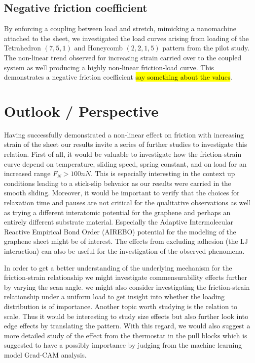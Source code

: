 \subsection{Negative friction coefficient}
By enforcing a coupling between load and stretch, mimicking a nanomachine attached to the sheet, we investigated the load curves arising from loading of the Tetrahedron $(7,5,1)$ and Honeycomb $(2,2,1,5)$ pattern from the pilot study. The non-linear trend observed for increasing strain carried over to the coupled system as well producing a highly non-linear friction-load curve. This demonstrates a negative friction coefficient \hl{say something about the values}.



\section{Outlook / Perspective}

Having successfully demonstrated a non-linear effect on friction with increasing
strain of the sheet our results invite a series of further studies to investigate this relation. First of all, it would be valuable to investigate how the friction-strain curve depend on temperature, sliding speed, spring constant, and on load for an increased range $F_N > 100 nN$. This is especially interesting in the context up conditions leading to a stick-slip behvaior as our results were carried in the smooth sliding. Moreover, it would be important to verify that the choices for relaxation time and pauses are not critical for the qualitative observations as well as trying a different
interatomic potential for the graphene and perhaps an entirely different
substrate material. Especially the Adaptive Intermolecular Reactive Empirical
Bond Order (AIREBO) potential for the modeling of the graphene sheet might be of interest. The effects from excluding adhesion (the \acrshort{LJ} interaction) can also be useful for the investigation of the observed phenomena. 


In order to get a better understanding of the underlying mechanism for the friction-strain relationship we might investigate commensurability effects further by varying the scan angle. we might also consider investigating the friction-strain relationship under a uniform load to get insight into whether the loading distribution is of importance. Another topic worth studying is the relation to scale. Thus it would be interesting to study size effects but also further look into edge effects by translating the pattern. With this regard, we would also suggest a more detailed study of the effect from the thermostat in the pull blocks which is suggested to have a possibly importance by judging from the machine learning model Grad-CAM analysis. 

